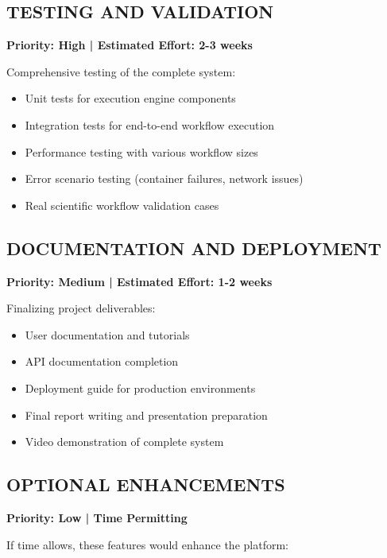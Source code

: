 \documentclass[12pt]{article}
\begin{document}
\subsection{TESTING AND VALIDATION}

\hspace{\parindent}\textbf{Priority: High | Estimated Effort: 2-3 weeks}

Comprehensive testing of the complete system:

\begin{itemize}
    \item Unit tests for execution engine components
    \item Integration tests for end-to-end workflow execution
    \item Performance testing with various workflow sizes
    \item Error scenario testing (container failures, network issues)
    \item Real scientific workflow validation cases
\end{itemize}

\subsection{DOCUMENTATION AND DEPLOYMENT}

\hspace{\parindent}\textbf{Priority: Medium | Estimated Effort: 1-2 weeks}

Finalizing project deliverables:

\begin{itemize}
    \item User documentation and tutorials
    \item API documentation completion
    \item Deployment guide for production environments
    \item Final report writing and presentation preparation
    \item Video demonstration of complete system
\end{itemize}

\subsection{OPTIONAL ENHANCEMENTS}

\hspace{\parindent}\textbf{Priority: Low | Time Permitting}

If time allows, these features would enhance the platform:
\end{document}
